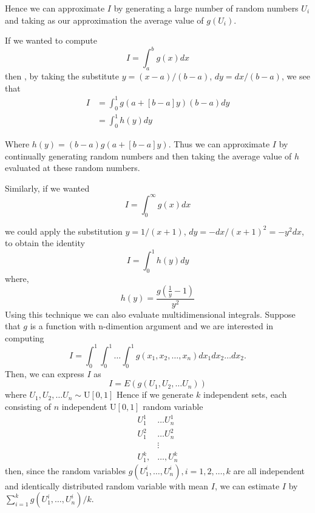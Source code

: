 Hence we can approximate $I$ by generating a large number of random numbers $U_i$ and taking
as our approximation the average value of $g(U_i)$.

If we wanted to compute
\[
	I = \int_{a}^{b} g(x) dx
\]
then , by taking the substitute $y=(x-a)/(b-a)$, $dy = dx/(b-a)$, we see that
\begin{align*}
	I & = \int_{0}^{1} g(a+[b-a]y)(b-a)dy \\
	  & = \int_{ 0}^{1} h(y) dy
\end{align*}

Where $h(y)= (b-a)g(a+[b-a]y)$. Thus we can approximate $I$ by continually generating random
numbers and then taking the average value of $h$ evaluated at these random numbers.

Similarly, if we wanted
\[
	I = \int_{0}^{\infty} g(x) dx
\]

we could apply the substitution $y=1/(x+1)$, $dy=-dx/(x+1)^{2} = -y ^{2} dx$, to obtain the identity
\[
	I=\int_{0}^{1} h(y)dy
\]
where, \[
	h(y) = \frac{g(\frac{1}{y} -1)}{y ^{2}}
\]
Using this technique we can also evaluate multidimensional integrals. Suppose that $g$ is a function with n-dimention argument
and we are interested in computing
\[
	I = \int_{0}^{1} \int_{0}^{1} \ldots \int_{0}^{1} g(x_1, x_2 , \ldots , x_n) dx_1 dx_2 \ldots dx_2.
\]
Then, we can express $I$ as
\[
	I = E(g(U_1, U_2, \ldots U_n))
\]
where $U_1, U_2, \ldots U_n \sim \text{U}[0,1]$  Hence  if we generate $k$ independent sets, each consisting of $n$ independent $\text{U}[0,1]$
random variable
\begin{align*}
	U_1^{1}   & \ldots U_n^{1}  \\
	U_1^{2}   & \ldots U_n^{2}  \\
	          & \vdots          \\
	U_1^{k} , & \ldots, U_n^{k}
\end{align*}
then, since the random variables $g(U_1^{i},\ldots, U_n^{i}), i = 1,2,\ldots,k  $ are all independent and identically distributed
random variable with mean $I$, we can estimate $I$ by $\sum_{i = 1}^{k}g(U_1^{i} , \ldots, U_n^{i} )/k $.


